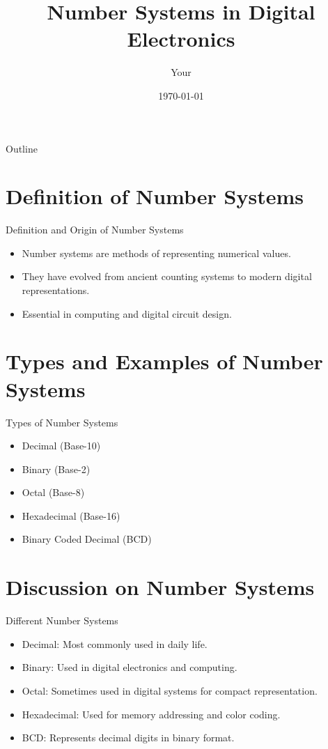 \documentclass{beamer}
\title{Number Systems in Digital Electronics}
\author{Your}
\date{\today}
\begin{document}
\begin{frame}
    \titlepage
\end{frame}

\begin{frame}{Outline}
    \tableofcontents
\end{frame}

\section{Definition of Number Systems}
\begin{frame}{Definition and Origin of Number Systems}
    \begin{itemize}
        \item Number systems are methods of representing numerical values.
        \item They have evolved from ancient counting systems to modern digital representations.
        \item Essential in computing and digital circuit design.
    \end{itemize}
\end{frame}

\section{Types and Examples of Number Systems}
\begin{frame}{Types of Number Systems}
    \begin{itemize}
        \item Decimal (Base-10)
        \item Binary (Base-2)
        \item Octal (Base-8)
        \item Hexadecimal (Base-16)
        \item Binary Coded Decimal (BCD)
    \end{itemize}
\end{frame}

\section{Discussion on Number Systems}
\begin{frame}{Different Number Systems}
    \begin{itemize}
        \item Decimal: Most commonly used in daily life.
        \item Binary: Used in digital electronics and computing.
        \item Octal: Sometimes used in digital systems for compact representation.
        \item Hexadecimal: Used for memory addressing and color coding.
        \item BCD: Represents decimal digits in binary format.
    \end{itemize}
\end{frame}
\end{document}
